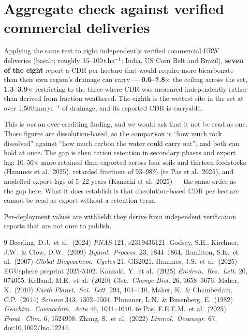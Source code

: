 \documentclass[11pt,a4paper]{article}
\begin{document}
\appendix
\section{Aggregate check against verified commercial deliveries}

Applying the same test to eight independently verified commercial ERW deliveries
(basalt; roughly 15--100\,t\,ha$^{-1}$; India, US Corn Belt and Brazil), \textbf{seven
of the eight} report a CDR per hectare that would require more bicarbonate than
their own region's drainage can carry --- \textbf{0.6--7.8$\times$} the ceiling across
the set, \textbf{1.3--3.9$\times$} restricting to the three where CDR was measured
independently rather than derived from fraction weathered. The eighth is the wettest
site in the set at over 1{,}500\,mm\,yr$^{-1}$ of drainage, and its reported CDR is
carryable.

This is \emph{not} an over-crediting finding, and we would ask that it not be read
as one. Those figures are dissolution-based, so the comparison is ``how much rock
dissolved'' against ``how much carbon the water could carry out'', and both can hold
at once. The gap is then cation retention in secondary phases and export lag: 10--50$
\times$ more retained than exported across four soils and thirteen feedstocks
(Hammes et al.\ 2025), retarded fractions of 93--98\% (te Pas et al.\ 2025), and
modelled export lags of 5--22 years (Kanzaki et al.\ 2025) --- the same order as the
gap here. What it does establish is that dissolution-based CDR per hectare cannot be
read as export without a retention term.

Per-deployment values are withheld: they derive from independent verification
reports that are not ours to publish.

\begin{thebibliography}{9}\small
{} Beerling, D.J.\ et al.\ (2024) \textit{PNAS} 121, e2319436121.
 Godsey, S.E., Kirchner, J.W.\ \& Clow, D.W.\ (2009) \textit{Hydrol.\ Process.} 23, 1844--1864.
 Hamilton, S.K.\ et al.\ (2007) \textit{Global Biogeochem.\ Cycles} 21, GB2021.
 Hammes, J.S.\ et al.\ (2025) EGUsphere preprint 2025-5402.
 Kanzaki, Y.\ et al.\ (2025) \textit{Environ.\ Res.\ Lett.} 20, 074055.
 Kelland, M.E.\ et al.\ (2020) \textit{Glob.\ Change Biol.} 26, 3658--3676.
 Maher, K.\ (2010) \textit{Earth Planet.\ Sci.\ Lett.} 294, 101--110.
 Maher, K.\ \& Chamberlain, C.P.\ (2014) \textit{Science} 343, 1502--1504.
 Plummer, L.N.\ \& Busenberg, E.\ (1982) \textit{Geochim.\ Cosmochim.\ Acta} 46, 1011--1040.
 te Pas, E.E.E.M.\ et al.\ (2025) \textit{Front.\ Clim.} 6, 1524998.
 Zhang, S.\ et al.\ (2022) \textit{Limnol.\ Oceanogr.} 67, doi:10.1002/lno.12244.
\end{thebibliography}
\end{document}

